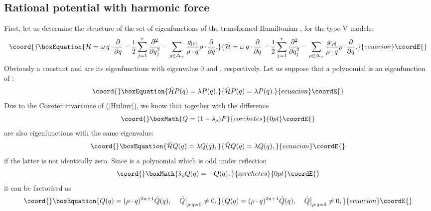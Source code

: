 \documentclass[a4paper,12pt]{article}
\begin{document}
\subsection{Rational potential with harmonic force}
\label{harmtri}
First, let us determine the structure of the set of eigenfunctions of the
transformed Hamiltonian \coordHE{}, for the type V models:
\begin{equation}\coord{}\boxEquation{
   \tilde{\cal H}=\omega\, q\cdot\!{\partial\over{\partial q}}
   -{1\over2}\sum_{j=1}^r{\partial^2\over{\partial q_j^2}}
   -\sum_{\rho\in\Delta_+}{g_{|\rho|}\over{\rho\cdot q}}
   \rho\cdot\!{\partial\over{\partial q}}.
   \label{Htilom}
}{
   \tilde{\cal H}=\omega\, q\cdot\!{\partial\over{\partial q}}
   -{1\over2}\sum_{j=1}^r{\partial^2\over{\partial q_j^2}}
   -\sum_{\rho\in\Delta_+}{g_{|\rho|}\over{\rho\cdot q}}
   \rho\cdot\!{\partial\over{\partial q}}.
   }{ecuacion}\coordE{}\end{equation}
Obviously a constant and \coordHE{}
are its eigenfunctions
with eigenvalue 0 and \myHighlight{\(2\omega\)}\coordHE{}, respectively.
Let us suppose that a polynomial  \coordHE{} is an eigenfunction
of \coordHE{}:
\begin{equation}\coord{}\boxEquation{
   \tilde{\cal H}P(q)=\lambda P(q).
   \label{htileigen}
}{
   \tilde{\cal H}P(q)=\lambda P(q).
   }{ecuacion}\coordE{}\end{equation}
Due to the Coxeter invariance of \coordHE{} (\ref{Htilinv}),
we know that \coordHE{} together with the difference
\[\coord{}\boxMath{
Q=(1-\check{s}_{\rho})P
}{corchetes}{0pt}\coordE{}\]
are also eigenfunctions with the same
eigenvalue:
\begin{equation}\coord{}\boxEquation{
   \tilde{\cal H}Q(q)=\lambda Q(q),
   \label{Qtileq}
}{
   \tilde{\cal H}Q(q)=\lambda Q(q),
   }{ecuacion}\coordE{}\end{equation}
if the latter is not identically zero. Since \coordHE{} is a polynomial which is
odd under reflection \coordHE{}
\[\coord{}\boxMath{
   \check{s}_{\rho}Q(q)=-Q(q),
}{corchetes}{0pt}\coordE{}\]
it can be factorised as
\begin{equation}\coord{}\boxEquation{
   Q(q)=(\rho\cdot q)^{2n+1}\tilde{Q}(q),\quad
   \left.\tilde{Q}\right|_{\rho\cdot q=0}\neq0,
   \label{Qtilfac}
}{
   Q(q)=(\rho\cdot q)^{2n+1}\tilde{Q}(q),\quad
   \left.\tilde{Q}\right|_{\rho\cdot q=0}\neq0,
   }{ecuacion}\coordE{}\end{equation}
\end{document}
